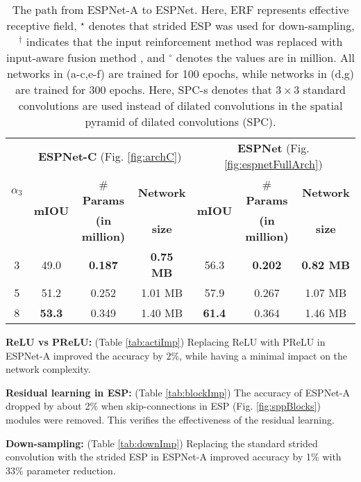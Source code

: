 \documentclass[runningheads]{llncs}
\def\Fig{Fig. }
\begin{document}
\begin{table}[t!]
\begin{subtable}[b]{0.4\columnwidth}
{\begin{tabular}{c|c|c|c||c|c|c}
				\toprule
				\multirow{3}{*}{$\alpha_3$}& \multicolumn{3}{|c||}{\textbf{ESPNet-C} (\Fig \ref{fig:archC})} & \multicolumn{3}{c}{\textbf{ESPNet} (\Fig \ref{fig:espnetFullArch})}\\
				\cline{2-7}
				& \multirow{2}{*}{\textbf{mIOU}} & \# \textbf{Params} & \textbf{Network} & \multirow{2}{*}{\textbf{mIOU}} & \# \textbf{Params} & \textbf{Network}\\
				&  & \textbf{(in million)} & \textbf{size} &  & \textbf{(in million)} & \textbf{size}\\
				\midrule
				3 & 49.0 & \textbf{0.187} & \textbf{0.75 MB} & 56.3 & \textbf{0.202} & \textbf{0.82 MB} \\
				5 & 51.2 & 0.252 & 1.01 MB & 57.9  & 0.267 & 1.07 MB \\
				8 & \textbf{53.3} & 0.349 & 1.40 MB & \textbf{61.4} &  0.364 & 1.46 MB\\
				\bottomrule
			\end{tabular}
		}
		\caption{}
		\label{tab:espnetCompare}
	\end{subtable}
	\caption{The path from ESPNet-A to ESPNet. Here, ERF represents effective receptive field, $^\star$ denotes that strided ESP was used for down-sampling, $^{\dagger}$ indicates that the input reinforcement method was replaced with input-aware fusion method \cite{mehta2017learning}, 
		and $^{\circ}$ denotes the values are in million. All networks in (a-c,e-f) are trained for 100 epochs, while networks in (d,g) are trained for 300 epochs. Here, SPC-s denotes that $3\times3$ standard convolutions are used instead of dilated convolutions in the spatial pyramid of dilated convolutions (SPC).}
	\label{tab:ablationStudies}
\end{table}	

\noindent \textbf{ReLU vs PReLU:} (Table \ref{tab:actiImp}) Replacing ReLU \cite{nair2010rectified} with PReLU \cite{he2015delving} in ESPNet-A improved the accuracy by $2\%$, while having a minimal impact on the network complexity.

\noindent \textbf{Residual learning in ESP:} (Table \ref{tab:blockImp}) The accuracy of ESPNet-A dropped by about 2\% when skip-connections in ESP (\Fig \ref{fig:sppBlocks}) modules were removed. This verifies the effectiveness of the residual learning.

\noindent \textbf{Down-sampling:} (Table \ref{tab:downImp}) Replacing the standard strided convolution with the strided ESP in ESPNet-A improved accuracy by 1\% with $33\%$ parameter reduction.
\end{document}
